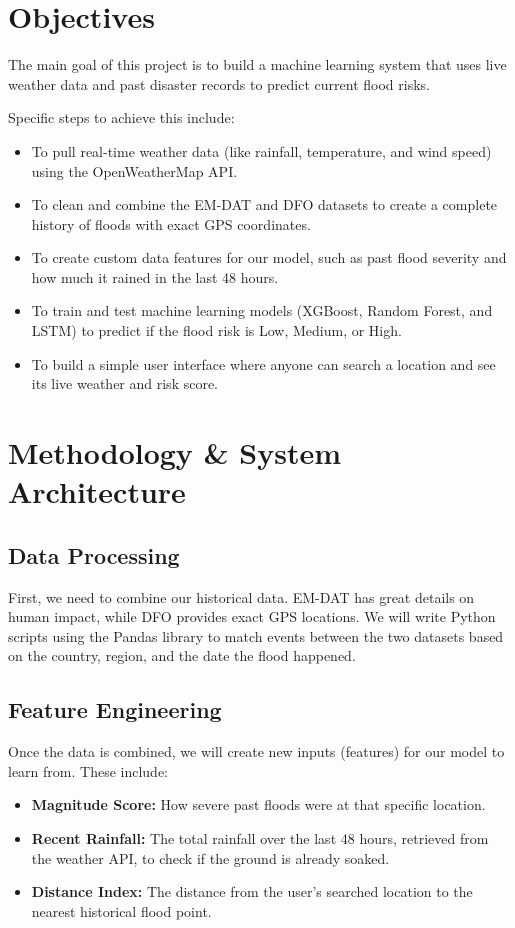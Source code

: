 \documentclass[11pt,a4paper]{article}
\begin{document}
\section{Objectives}
The main goal of this project is to build a machine learning system that uses live weather data and past disaster records to predict current flood risks.

Specific steps to achieve this include:
\begin{itemize}[noitemsep]
    \item To pull real-time weather data (like rainfall, temperature, and wind speed) using the OpenWeatherMap API.
    \item To clean and combine the EM-DAT and DFO datasets to create a complete history of floods with exact GPS coordinates.
    \item To create custom data features for our model, such as past flood severity and how much it rained in the last 48 hours.
    \item To train and test machine learning models (XGBoost, Random Forest, and LSTM) to predict if the flood risk is Low, Medium, or High.
    \item To build a simple user interface where anyone can search a location and see its live weather and risk score.
\end{itemize}

\section{Methodology \& System Architecture}

\subsection{Data Processing}
First, we need to combine our historical data. EM-DAT has great details on human impact, while DFO provides exact GPS locations. We will write Python scripts using the Pandas library to match events between the two datasets based on the country, region, and the date the flood happened. 

\subsection{Feature Engineering}
Once the data is combined, we will create new inputs (features) for our model to learn from. These include:
\begin{itemize}[noitemsep]
    \item \textbf{Magnitude Score:} How severe past floods were at that specific location.
    \item \textbf{Recent Rainfall:} The total rainfall over the last 48 hours, retrieved from the weather API, to check if the ground is already soaked.
    \item \textbf{Distance Index:} The distance from the user's searched location to the nearest historical flood point.
\end{itemize}
\end{document}
